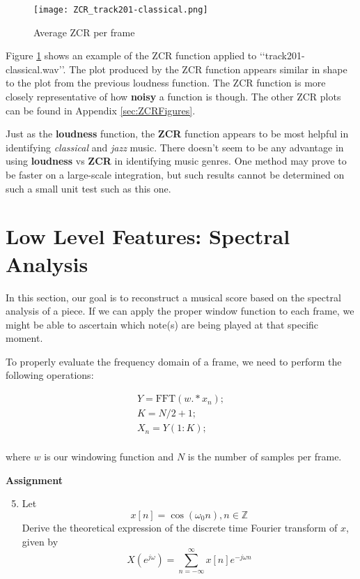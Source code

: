 \documentclass{article} %
\begin{document}



\begin{figure}[H]
\centering
\texttt{[image: ZCR\_track201-classical.png]}
\caption{Average ZCR per frame}
\label{fig:ZCR}
\end{figure}


Figure \ref{fig:ZCR} shows an example of the ZCR function applied to \lq\lq{}track201-classical.wav\rq\rq{}. The plot produced by the ZCR function appears similar in shape to the plot from
the previous loudness function. The ZCR function is more closely representative of how \textbf{noisy} a function is though. 
The other ZCR plots can be found in Appendix \ref{sec:ZCRFigures}. 

Just as the \textbf{loudness} function, the \textbf{ZCR} function appears to be most helpful in identifying \emph{classical} and \emph{jazz} music. 
There doesn't seem to be any advantage in using \textbf{loudness} vs \textbf{ZCR} in identifying music genres. One method may prove to be faster on a large-scale integration,
but such results cannot be determined on such a small unit test such as this one. 

\section{Low Level Features: Spectral Analysis}
In this section, our goal is to reconstruct a musical score based on the spectral analysis of a piece. If we can apply the proper window function to each frame, we might be able
to ascertain which note(s) are being played at that specific moment. 

To properly evaluate the frequency domain of a frame, we need to perform the following operations:

\begin{framed}
\begin{equation}
\label{eq:window}
\begin{aligned}
Y=\text{FFT}(w.*x_n);\\
K=N/2+1;\\
X_n=Y(1:K);\\
\end{aligned}
\end{equation}
\end{framed}
where $w$ is our windowing function and $N$ is the number of samples per frame.

\begin{framed}
\textbf{Assignment}
\begin{enumerate}
\setcounter{enumi}{4}
\item Let
\begin{equation}
\label{eq:cosFT}
x[n]=\cos(\omega_0 n), n \in\mathbb{Z}
\end{equation}
Derive the theoretical expression of the discrete time Fourier transform of $x$, given by
\begin{equation}
\label{eq:DFT}
X(e^{j \omega})=\sum\limits_{n=-\infty}^{\infty} x[n]e^{-j \omega n}
\end{equation}
\end{enumerate}
\end{framed}
\end{document}
